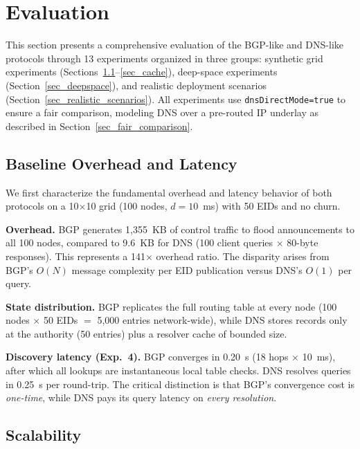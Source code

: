 \documentclass[journal,twocolumn]{IEEEtran}
\begin{document}
\section{Evaluation}
\label{sec_evaluation}

This section presents a comprehensive evaluation of the BGP-like and DNS-like protocols through 13 experiments organized in three groups: synthetic grid experiments (Sections~\ref{sec_baseline}--\ref{sec_cache}), deep-space experiments (Section~\ref{sec_deepspace}), and realistic deployment scenarios (Section~\ref{sec_realistic_scenarios}). 
All experiments use \texttt{dnsDirectMode=true} to ensure a fair comparison, modeling DNS over a pre-routed IP underlay as described in Section~\ref{sec_fair_comparison}.

\subsection{Baseline Overhead and Latency}
\label{sec_baseline}

We first characterize the fundamental overhead and latency behavior of both protocols on a 10$\times$10 grid (100 nodes, $d = 10$~ms) with 50 EIDs and no churn.

\textbf{Overhead.} BGP generates 1,355~KB of control traffic to flood announcements to all 100 nodes, compared to 9.6~KB for DNS (100 client queries $\times$ 80-byte responses). 
This represents a 141$\times$ overhead ratio. 
The disparity arises from BGP's $O(N)$ message complexity per EID publication versus DNS's $O(1)$ per query.

\textbf{State distribution.} BGP replicates the full routing table at every node (100 nodes $\times$ 50 EIDs $=$ 5{,}000 entries network-wide), while DNS stores records only at the authority (50 entries) plus a resolver cache of bounded size.

\textbf{Discovery latency (Exp.~4).} BGP converges in 0.20~s (18 hops $\times$ 10~ms), after which all lookups are instantaneous local table checks.
DNS resolves queries in 0.25~s per round-trip.
The critical distinction is that BGP's convergence cost is \emph{one-time}, while DNS pays its query latency on \emph{every resolution}.

\subsection{Scalability}
\label{sec_scalability}
\end{document}
